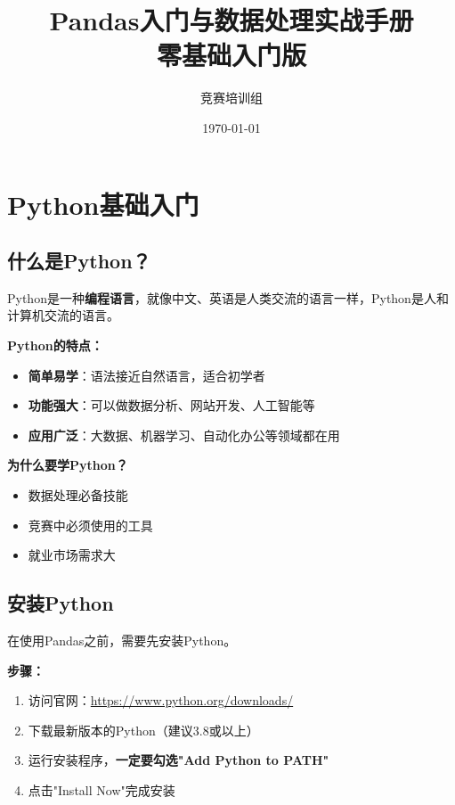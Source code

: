 \documentclass[12pt,a4paper]{article}
\title{\textbf{Pandas入门与数据处理实战手册}\\[0.5em]\large 零基础入门版}
\author{竞赛培训组}
\date{\today}
\begin{document}
\maketitle
\tableofcontents
\newpage

\section{Python基础入门}

\subsection{什么是Python？}

\begin{knowledgebox}
Python是一种\textbf{编程语言}，就像中文、英语是人类交流的语言一样，Python是人和计算机交流的语言。

\textbf{Python的特点：}
\begin{itemize}
    \item \textbf{简单易学}：语法接近自然语言，适合初学者
    \item \textbf{功能强大}：可以做数据分析、网站开发、人工智能等
    \item \textbf{应用广泛}：大数据、机器学习、自动化办公等领域都在用
\end{itemize}

\textbf{为什么要学Python？}
\begin{itemize}
    \item 数据处理必备技能
    \item 竞赛中必须使用的工具
    \item 就业市场需求大
\end{itemize}
\end{knowledgebox}

\subsection{安装Python}

在使用Pandas之前，需要先安装Python。

\textbf{步骤：}
\begin{enumerate}
    \item 访问官网：\url{https://www.python.org/downloads/}
    \item 下载最新版本的Python（建议3.8或以上）
    \item 运行安装程序，\textbf{一定要勾选"Add Python to PATH"}
    \item 点击"Install Now"完成安装
\end{enumerate}
\end{document}
